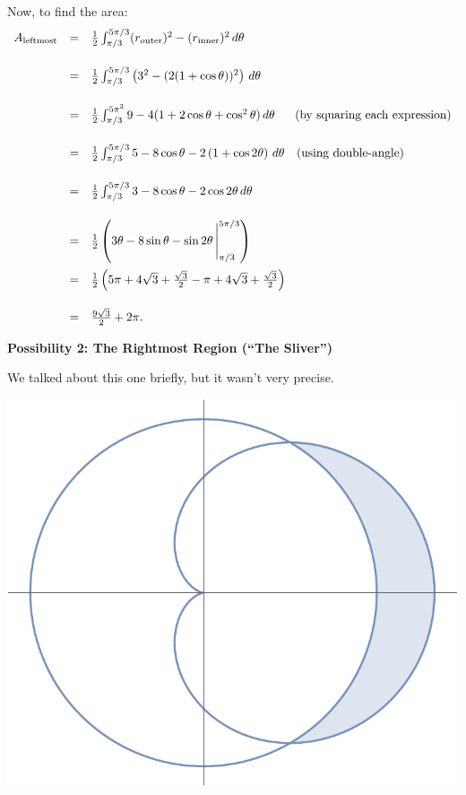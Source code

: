 \documentclass[12pt]{article}
\begin{document}
	Now, to find the area:
	$$\begin{array}{rcl}
		A_{\text{leftmost}} & = & \frac{1}{2}\int_{\pi/3}^{5\pi/3}(r_{\text{outer}})^2-(r_{\text{inner}})^2\,d\theta\\[6mm]
		 & = & \frac{1}{2} \int_{\pi/3}^{5\pi/3}\left(3^2 - (2(1+\cos{\theta}))^2\right)\,d\theta\\[6mm]
		 & = & \frac{1}{2} \int_{\pi/3}^{5\pi^3}9-4(1+2\cos{\theta}+\cos^2\theta)\,d\theta\text{\quad\,\, (by squaring each expression)}\\[6mm]
		 & = & \frac{1}{2} \int_{\pi/3}^{5\pi/3}5-8\cos\theta-2\left(1+\cos{2\theta}\right)\,d\theta\text{\quad (using double-angle)}\\[6mm]
		 & = & \frac{1}{2} \int_{\pi/3}^{5\pi/3}3-8\cos\theta-2\cos{2\theta}\,d\theta\\[6mm]
		 & = & \frac{1}{2} \left(3\theta -8\sin{\theta}-\sin{2\theta}\,\Bigg|_{\pi/3}^{5\pi/3}\right)\\[6mm]
		 & = & \frac{1}{2} \left(5\pi+4\sqrt{3}+\frac{\sqrt{3}}{2}-\pi+4\sqrt{3}+\frac{\sqrt{3}}{2}\right)\\[6mm]
		 & = & \frac{9\sqrt{3}}{2}+2\pi.
	\end{array}$$
	
	\vspace{3mm}
	
	\noindent\textbf{Possibility 2: The Rightmost Region (``The Sliver'')}
	
	We talked about this one briefly, but it wasn't very precise.
		
	\begin{center}
		\includegraphics[scale=0.75]{region3}
	\end{center}
	
\end{document}
